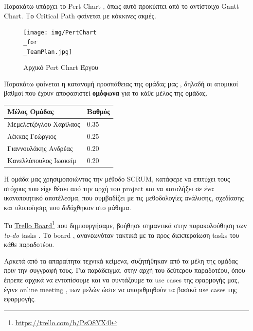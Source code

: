 \documentclass{../ol-softwaremanual}
\newcommand{\doclink}[2]{\href{#1}{#2}\footnote{\url{#1}}}
\begin{document}
	
	\flushleft
	Παρακάτω υπάρχει το \en Pert Chart \gr, όπως αυτό προκύπτει από το αντίστοιχο \en Gantt Chart\gr. Το \en Critical Path \gr φαίνεται με κόκκινες ακμές.
	
	\begin{figure}[htbp!]
		
		\texttt{[image: img/PertChart\\\_for\\\_TeamPlan.jpg]}
		\caption{Αρχικό \en Pert Chart \gr Έργου}
	\end{figure}
	
	\flushleft
	Παρακάτω φαίνεται η κατανομή προσπάθειας της ομάδας μας , δηλαδή οι ατομικοί βαθμοί που έχουν αποφασιστεί \textbf{ομόφωνα} για το κάθε μέλος της ομάδας.
	
	\begin{table}[htbp!]
		\centering
		\begin{tabular}{|l|l|}
			\hline
			\textbf{Μέλος Ομάδας} & \textbf{Βαθμός} \\ \hline
			Μεμελετζόγλου Χαρίλαος &       0.35     \\ \hline
			Λέκκας Γεώργιος		   & 	   0.25		\\ \hline
			Γιαννουλάκης Ανδρέας   &	   0.20		\\ \hline
			Κανελλόπουλος Ιωακείμ  &	   0.20 	\\ \hline
		\end{tabular}
	\end{table}
	
	
	\flushleft
	Η ομάδα μας χρησιμοποιώντας την μέθοδο \en SCRUM\gr, κατάφερε να επιτύχει τους στόχους που είχε θέσει από την αρχή του \en project \gr και να καταλήξει σε ένα ικανοποιητικό αποτέλεσμα, που συμβαδίζει με τις μεθοδολογίες ανάλυσης, σχεδίασης και υλοποίησης που διδάχθηκαν στο μάθημα. \break
	
	Το \en \doclink{https://trello.com/b/PsO8YX4l}{Trello Board} \gr που δημιουργήσαμε, βοήθησε σημαντικά στην παρακολούθηση των \en \textit{to-do} tasks \gr. Το \en board \gr, ανανεωνόταν τακτικά με τα προς διεκπεραίωση \en tasks \gr του κάθε παραδοτέου. \break
	
	Αρκετά από τα απαραίτητα τεχνικά κείμενα, συζητήθηκαν από τα μέλη της ομάδας πριν την συγγραφή τους. Για παράδειγμα, στην αρχή του δεύτερου παραδοτέου, όπου έπρεπε αρχικά να εντοπίσουμε και να συντάξουμε τα \en use cases \gr της εφαρμογής μας, έγινε \en online meeting \gr, των μελών ώστε να απαριθμηθούν τα βασικά \en use cases \gr της εφαρμογής. \break
	
\end{document}
